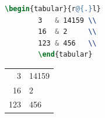 \begin{enumerate}
    \begin{figure}[!hpbt]
        \begin{minipage}{0.5\textwidth}
        \begin{lstlisting}[language=tex]
        \begin{tabular}{r@{.}l}
        3   & 14159 \\
        16  & 2     \\
        123 & 456   \\
        \end{tabular}
        \end{lstlisting}%
        \end{minipage}
        \begin{minipage}{0.45\textwidth}
        \centering
        \begin{tabular}{r@{.}l}
        3   & 14159 \\
        16  & 2     \\
        123 & 456   \\
        \end{tabular}
        \end{minipage}
    \end{figure}


\end{enumerate}
